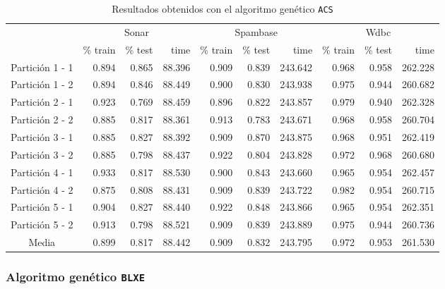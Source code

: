 \documentclass[11pt]{article}
\theoremstyle{plain}
\theoremstyle{definition}
\begin{document}
\begin{table}[H]
\centering
\caption{Resultados obtenidos con el algoritmo genético \texttt{ACS}}
\label{tbl-acs}
\begin{tabular}{@{}crrrrrrrrr@{}}
  \toprule
  & \multicolumn{3}{c}{Sonar} & \multicolumn{3}{c}{Spambase} & \multicolumn{3}{c}{Wdbc}  \\
  \cmidrule(r){2-10}
           & \% train & \% test & time & \% train   & \% test   & time & \% train & \% test & time \\
  \midrule
Partición 1 - 1      & 0.894 & 0.865 & 88.396 & 0.909 & 0.839 & 243.642 & 0.968 & 0.958 & 262.228 \\
Partición 1 - 2      & 0.894 & 0.846 & 88.449 & 0.900 & 0.830 & 243.938 & 0.975 & 0.944 & 260.682 \\
Partición 2 - 1      & 0.923 & 0.769 & 88.459 & 0.896 & 0.822 & 243.857 & 0.979 & 0.940 & 262.328 \\
Partición 2 - 2      & 0.885 & 0.817 & 88.361 & 0.913 & 0.783 & 243.671 & 0.968 & 0.958 & 260.704 \\
Partición 3 - 1      & 0.885 & 0.827 & 88.392 & 0.909 & 0.870 & 243.875 & 0.968 & 0.951 & 262.419 \\
Partición 3 - 2      & 0.885 & 0.798 & 88.437 & 0.922 & 0.804 & 243.828 & 0.972 & 0.968 & 260.680 \\
Partición 4 - 1      & 0.933 & 0.817 & 88.530 & 0.900 & 0.843 & 243.660 & 0.965 & 0.954 & 262.457 \\
Partición 4 - 2      & 0.875 & 0.808 & 88.431 & 0.909 & 0.839 & 243.722 & 0.982 & 0.954 & 260.715 \\
Partición 5 - 1      & 0.904 & 0.827 & 88.440 & 0.922 & 0.848 & 243.866 & 0.965 & 0.954 & 262.351 \\
Partición 5 - 2      & 0.913 & 0.798 & 88.521 & 0.909 & 0.839 & 243.889 & 0.975 & 0.944 & 260.736 \\
  \bottomrule
Media                & 0.899 & 0.817 & 88.442 & 0.909 & 0.832 & 243.795 & 0.972 & 0.953 & 261.530 \\
\end{tabular}
\end{table}

\subsubsection{Algoritmo genético \texttt{BLXE}}
\end{document}
